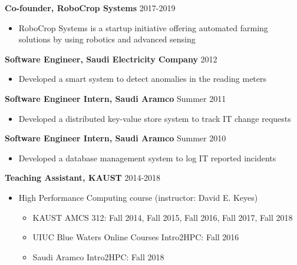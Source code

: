 \documentclass[9pt,a4paper]{extarticle}
\begin{document}
{
\textbf{Co-founder, RoboCrop Systems} \hfill 2017-2019
\begin{itemize}
  \item RoboCrop Systems is a startup initiative offering automated farming
  solutions by using robotics and advanced sensing\\
\end{itemize}

\textbf{Software Engineer, Saudi Electricity Company} \hfill 2012
\begin{itemize}
  \item Developed a smart system to detect anomalies in the reading meters\\
\end{itemize}

\textbf{Software Engineer Intern, Saudi Aramco} \hfill Summer 2011
\begin{itemize}
  \item Developed a distributed key-value store system to track IT change requests\\
\end{itemize}

\textbf{Software Engineer Intern, Saudi Aramco} \hfill Summer 2010
\begin{itemize}
  \item Developed a database management system to log IT reported incidents
\end{itemize}
}
\bigskip

{
\textbf{Teaching Assistant, KAUST} \hfill 2014-2018
\begin{itemize}
  \item High Performance Computing course (instructor: David E. Keyes)
  \begin{itemize}
  \item
  KAUST AMCS 312: Fall 2014, Fall 2015, Fall 2016, Fall 2017, Fall 2018
  \item
  UIUC Blue Waters Online Courses Intro2HPC: Fall 2016
  \item
  Saudi Aramco Intro2HPC: Fall 2018
  \end{itemize}
\end{itemize}
}
\bigskip
\end{document}
